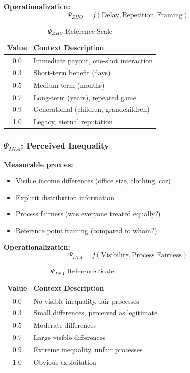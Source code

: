 \textbf{Operationalization:}
\begin{equation}
\Psi_{ZHO} = f(\text{Delay}, \text{Repetition}, \text{Framing})
\end{equation}

\begin{table}[htbp]
\centering
\caption{$\Psi_{ZHO}$ Reference Scale}
\begin{tabular}{@{}cl@{}}
\toprule
\textbf{Value} & \textbf{Context Description} \\
\midrule
0.0 & Immediate payout, one-shot interaction \\
0.3 & Short-term benefit (days) \\
0.5 & Medium-term (months) \\
0.7 & Long-term (years), repeated game \\
0.9 & Generational (children, grandchildren) \\
1.0 & Legacy, eternal reputation \\
\bottomrule
\end{tabular}
\end{table}

\subsubsection{$\Psi_{INA}$: Perceived Inequality}

\textbf{Measurable proxies:}
\begin{itemize}
\item Visible income differences (office size, clothing, car)
\item Explicit distribution information
\item Process fairness (was everyone treated equally?)
\item Reference point framing (compared to whom?)
\end{itemize}

\textbf{Operationalization:}
\begin{equation}
\Psi_{INA} = f(\text{Visibility}, \text{Process Fairness})
\end{equation}

\begin{table}[htbp]
\centering
\caption{$\Psi_{INA}$ Reference Scale}
\begin{tabular}{@{}cl@{}}
\toprule
\textbf{Value} & \textbf{Context Description} \\
\midrule
0.0 & No visible inequality, fair processes \\
0.3 & Small differences, perceived as legitimate \\
0.5 & Moderate differences \\
0.7 & Large visible differences \\
0.9 & Extreme inequality, unfair processes \\
1.0 & Obvious exploitation \\
\bottomrule
\end{tabular}
\end{table}


